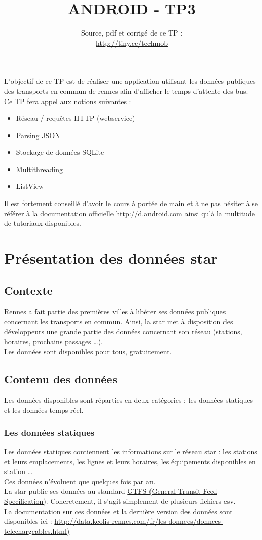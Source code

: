 \documentclass{article}
\title{ANDROID - TP3}
\date{Source, pdf et corrigé de ce TP
:\\\href{http://tiny.cc/techmob}{http://tiny.cc/techmob}}
\begin{document}
\maketitle
L'objectif de ce TP est de réaliser une application utilisant les données
publiques des transports en commun de rennes afin d'afficher le temps
d'attente des bus.\\
Ce TP fera appel aux notions suivantes :
\begin{itemize}
  \item Réseau / requêtes HTTP (webservice)
  \item Parsing JSON
  \item Stockage de données SQLite
  \item Multithreading
  \item ListView
\end{itemize}
Il est fortement conseillé d'avoir le cours à portée de main et à ne pas hésiter
à se référer à la documentation officielle
\href{http://d.android.com}{http://d.android.com} ainsi qu'à la multitude de
tutoriaux disponibles.
\section{Présentation des données star}
\subsection{Contexte}
Rennes a fait partie des premières villes à libérer ses données publiques
concernant les transports en commun. Ainsi, la star met à disposition des
développeurs une grande partie des données concernant son réseau (stations,
horaires, prochains passages \ldots).\\
Les données sont disponibles pour tous, gratuitement.
\subsection{Contenu des données}
Les données disponibles sont réparties en deux catégories : les données
statiques et les données temps réel.
\subsubsection{Les données statiques}
Les données statiques contiennent les informations sur le réseau star : les
stations et leurs emplacements, les lignes et leurs horaires, les équipements
disponibles en station \ldots\\
Ces données n'évoluent que quelques fois par an.\\
La star publie ses données au standard \href{https://developers.google.com/transit/gtfs/reference}{GTFS (General
Transit Feed Specification)}. Concretement, il s'agit simplement de plusieurs
fichiers csv.\\
La documentation sur ces données et la dernière version des données sont
disponibles ici :
\href{http://data.keolis-rennes.com/fr/les-donnees/donnees-telechargeables.html}{http://data.keolis-rennes.com/fr/les-donnees/donnees-telechargeables.html)}
\end{document}
